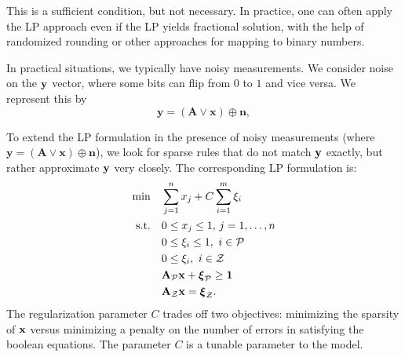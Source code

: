 This is a sufficient condition, but not necessary. In practice, one can often apply
the LP approach even if the LP yields fractional solution, with the help
of randomized rounding or other approaches for mapping to binary numbers.

In practical situations, we typically have noisy measurements.
We consider noise on the $\mathbf{y}$ vector, where some bits can flip from
$0$ to $1$ and vice versa. We represent this by
\begin{equation}
\label{eq:noisyforwardtest}
	\mathbf{y} = (\mathbf{A} \lor \mathbf{x}) \oplus \mathbf{n},
\end{equation}

To extend the LP formulation in the presence of noisy measurements (where $\mathbf{y} = (\mathbf{A} \lor \mathbf{x}) \oplus \mathbf{n}$), we look
for sparse rules that do not match $\mathbf{y}$ exactly, but rather approximate
$\mathbf{y}$ very closely. The corresponding LP formulation is:
\begin{align}
\label{eq:booleanl1minLPslack}
	\min\quad &\sum_{j=1}^{n} x_j + C\sum_{i=1}^{m}\xi_i\\
	\textrm{s.t.\quad} & 0 \le x_j \le 1,\,j = 1,\ldots,n\nonumber\\
		& 0 \le \xi_i \le 1, ~i \in \mathcal{P} \nonumber\\
		& 0 \le \xi_i, ~i \in \mathcal{Z}\nonumber\\
		& \mathbf{A}_{\mathcal{P}}\mathbf{x} + \boldsymbol{\xi}_{\mathcal{P}} \ge \mathbf{1}\nonumber\\
		& \mathbf{A}_{\mathcal{Z}}\mathbf{x} = \boldsymbol{\xi}_{\mathcal{Z}}.\nonumber
\end{align}
The regularization parameter $C$ trades off two objectives: minimizing the sparsity of $\mathbf{x}$ versus minimizing a penalty on the number of errors in satisfying the boolean equations. The parameter $C$ is a tunable parameter to the model.



